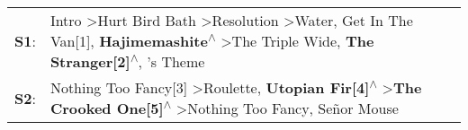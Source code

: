 \begin{supertabular}{p{0.03\textwidth}p{0.92\textwidth}}
 \textbf{S1}:  &  Intro\textsuperscript{} \textgreater \enspace Hurt Bird Bath\textsuperscript{} \textgreater \enspace Resolution\textsuperscript{} \textgreater \enspace Water\textsuperscript{}, \enspace Get In The Van[1]\textsuperscript{}, \enspace \textbf{Hajimemashite\textsuperscript{$\wedge$}} \textgreater \enspace The Triple Wide\textsuperscript{}, \enspace \textbf{The Stranger[2]\textsuperscript{$\wedge$}}, 's Theme\textsuperscript{}  \enspace  \\
 \textbf{S2}:  &                                                                                                                     Nothing Too Fancy[3]\textsuperscript{} \textgreater \enspace Roulette\textsuperscript{}, \enspace \textbf{Utopian Fir[4]\textsuperscript{$\wedge$}} \textgreater \enspace \textbf{The Crooked One[5]\textsuperscript{$\wedge$}} \textgreater \enspace Nothing Too Fancy\textsuperscript{}, \enspace Señor Mouse\textsuperscript{}  \enspace  \\
\end{supertabular}
